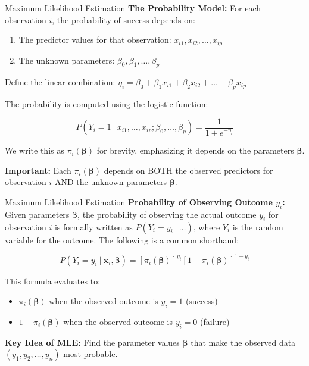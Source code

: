\documentclass[aspectratio=169,ignorenonframetext]{beamer}
\begin{document}
\begin{frame}{Maximum Likelihood Estimation}
\textbf{The Probability Model:} For each observation \(i\), the
probability of success depends on:

\begin{enumerate}
\item
  The predictor values for that observation:
  \(x_{i1},x_{i2},\ldots,x_{ip}\)
\item
  The unknown parameters: \(\beta_{0},\beta_{1},\ldots,\beta_{p}\)
\end{enumerate}

Define the linear combination:
\(\eta_{i} = \beta_{0} + \beta_{1}x_{i1} + \beta_{2}x_{i2} + \ldots + \beta_{p}x_{ip}\)

The probability is computed using the logistic function:

\[P\left( Y_{i} = 1~|~x_{i1},\ldots,x_{ip};\beta_{0},\ldots,\beta_{p} \right) = \frac{1}{1 + e^{- \eta_{i}}}\]

We write this as \(\pi_{i}\left( \mathbf{\beta} \right)\) for brevity,
emphasizing it depends on the parameters \(\mathbf{\beta}\).

\textbf{Important:} Each \(\pi_{i}\left( \mathbf{\beta} \right)\)
depends on BOTH the observed predictors for observation \(i\) AND the
unknown parameters \(\mathbf{\beta}\).
\end{frame}

\begin{frame}{Maximum Likelihood Estimation}
\textbf{Probability of Observing Outcome \(y_{i}\):} Given parameters
\(\mathbf{\beta}\), the probability of observing the actual outcome
\(y_{i}\) for observation \(i\) is formally written as
\(P\left( Y_{i} = y_{i}~|~\ldots \right)\), where \(Y_{i}\) is the
random variable for the outcome. The following is a common shorthand:

\[P\left( Y_{i} = y_{i}~|~\mathbf{x}_{i},\mathbf{\beta} \right) = \left\lbrack \pi_{i}\left( \mathbf{\beta} \right) \right\rbrack^{y_{i}}\left\lbrack 1 - \pi_{i}\left( \mathbf{\beta} \right) \right\rbrack^{1 - y_{i}}\]

This formula evaluates to:

\begin{itemize}
\item
  \(\pi_{i}\left( \mathbf{\beta} \right)\) when the observed outcome is
  \(y_{i} = 1\) (success)
\item
  \(1 - \pi_{i}\left( \mathbf{\beta} \right)\) when the observed outcome
  is \(y_{i} = 0\) (failure)
\end{itemize}

\textbf{Key Idea of MLE:} Find the parameter values \(\mathbf{\beta}\)
that make the observed data \(\left( y_{1},y_{2},\ldots,y_{n} \right)\)
most probable.
\end{frame}
\end{document}
